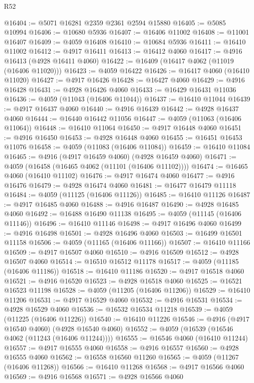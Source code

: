 \begin{lexlean}{R52}
\begin{coremodule}
@16404 := @5071 @16281 @2359 @2361 @2594 @15880
@16405 := @5085 @10994
@16406 := @10680 @5936
@16407 := @16406 @11002
@16408 := @11001 @16407
@16409 := @4059 @16408
@16410 := @10684 @5936
@16411 := @16410 @11002
@16412 := @4917 @16411
@16413 := @16412 @4060
@16417 := @4916 @16413 (@4928 @16411 @4060)
@16422 := @16409 (@16417 @4062 (@11019 (@16406 @11020)))
@16423 := @4059 @16422
@16426 := @16417 @4060 (@16410 @11020)
@16427 := @4917 @16426
@16428 := @16427 @4060
@16429 := @4916 @16428
@16431 := @4928 @16426 @4060
@16433 := @16429 @16431 @11036
@16436 := @4059 (@11043 (@16406 @11044))
@16437 := @16410 @11044
@16439 := @4917 @16437 @4060
@16440 := @4916 @16439
@16442 := @4928 @16437 @4060
@16444 := @16440 @16442 @11056
@16447 := @4059 (@11063 (@16406 @11064))
@16448 := @16410 @11064
@16450 := @4917 @16448 @4060
@16451 := @4916 @16450
@16453 := @4928 @16448 @4060
@16455 := @16451 @16453 @11076
@16458 := @4059 (@11083 (@16406 @11084))
@16459 := @16410 @11084
@16465 := @4916 (@4917 @16459 @4060) (@4928 @16459 @4060)
@16471 := @4059 (@16458 (@16465 @4062 (@11101 (@16406 @11102))))
@16474 := @16465 @4060 (@16410 @11102)
@16476 := @4917 @16474 @4060
@16477 := @4916 @16476
@16479 := @4928 @16474 @4060
@16481 := @16477 @16479 @11118
@16484 := @4059 (@11125 (@16406 @11126))
@16485 := @16410 @11126
@16487 := @4917 @16485 @4060
@16488 := @4916 @16487
@16490 := @4928 @16485 @4060
@16492 := @16488 @16490 @11138
@16495 := @4059 (@11145 (@16406 @11146))
@16496 := @16410 @11146
@16498 := @4917 @16496 @4060
@16499 := @4916 @16498
@16501 := @4928 @16496 @4060
@16503 := @16499 @16501 @11158
@16506 := @4059 (@11165 (@16406 @11166))
@16507 := @16410 @11166
@16509 := @4917 @16507 @4060
@16510 := @4916 @16509
@16512 := @4928 @16507 @4060
@16514 := @16510 @16512 @11178
@16517 := @4059 (@11185 (@16406 @11186))
@16518 := @16410 @11186
@16520 := @4917 @16518 @4060
@16521 := @4916 @16520
@16523 := @4928 @16518 @4060
@16525 := @16521 @16523 @11198
@16528 := @4059 (@11205 (@16406 @11206))
@16529 := @16410 @11206
@16531 := @4917 @16529 @4060
@16532 := @4916 @16531
@16534 := @4928 @16529 @4060
@16536 := @16532 @16534 @11218
@16539 := @4059 (@11225 (@16406 @11226))
@16540 := @16410 @11226
@16546 := @4916 (@4917 @16540 @4060) (@4928 @16540 @4060)
@16552 := @4059 (@16539 (@16546 @4062 (@11243 (@16406 @11244))))
@16555 := @16546 @4060 (@16410 @11244)
@16557 := @4917 @16555 @4060
@16558 := @4916 @16557
@16560 := @4928 @16555 @4060
@16562 := @16558 @16560 @11260
@16565 := @4059 (@11267 (@16406 @11268))
@16566 := @16410 @11268
@16568 := @4917 @16566 @4060
@16569 := @4916 @16568
@16571 := @4928 @16566 @4060

\end{coremodule}
\end{lexlean}
